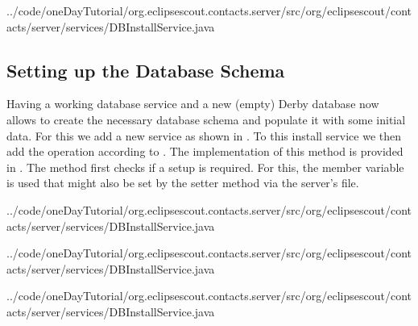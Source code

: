 \documentclass[a4paper,10pt,twoside]{book}
\begin{document}

{../code/oneDayTutorial/org.eclipsescout.contacts.server/src/org/eclipsescout/contacts/server/services/DBInstallService.java}

\subsection{Setting up the Database Schema}

Having a working database service and a new (empty) Derby database now allows to create the necessary database schema and populate it with some initial data.
For this we add a new  service as shown in .
To this install service we then add the  operation according to .
The implementation of this method is provided in .
The method first checks if a setup is required. 
For this, the member variable  is used that might also be set by the  setter method via the server's  file.


{../code/oneDayTutorial/org.eclipsescout.contacts.server/src/org/eclipsescout/contacts/server/services/DBInstallService.java}


{../code/oneDayTutorial/org.eclipsescout.contacts.server/src/org/eclipsescout/contacts/server/services/DBInstallService.java}


{../code/oneDayTutorial/org.eclipsescout.contacts.server/src/org/eclipsescout/contacts/server/services/DBInstallService.java}
\end{document}
